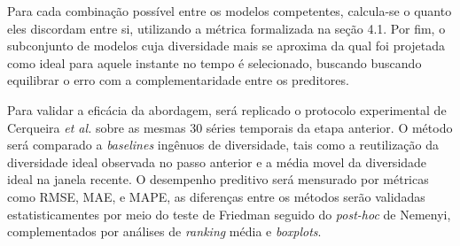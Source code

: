 Para cada combinação possível entre os modelos competentes, calcula-se o quanto eles discordam entre si, utilizando a métrica formalizada na seção 4.1. Por fim, o subconjunto de modelos cuja diversidade mais se aproxima da qual foi projetada como ideal para aquele instante no tempo é selecionado, buscando buscando equilibrar o erro com a complementaridade entre os preditores.

Para validar a eficácia da abordagem, será replicado o protocolo experimental de  Cerqueira \textit{et al.} \cite{cerqueiraArbitrageForecastingExperts2019} sobre as mesmas 30 séries temporais da etapa anterior. O método será comparado a \textit{baselines} ingênuos de diversidade, tais como a reutilização da diversidade ideal observada no passo anterior e a média movel da diversidade ideal na janela recente. O desempenho preditivo será mensurado por métricas como RMSE, MAE, e MAPE, as diferenças entre os métodos serão validadas estatisticamentes por meio do teste de Friedman seguido do \textit{post-hoc} de Nemenyi, complementados por análises de \textit{ranking} média e \textit{boxplots}.